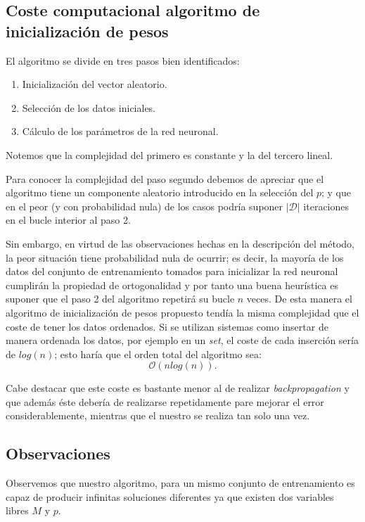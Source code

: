 \subsection{Coste computacional algoritmo de inicialización de pesos}

El algoritmo se divide en tres pasos bien identificados: 
\begin{enumerate}
    \item Inicialización del vector aleatorio.
    \item Selección de los datos iniciales.
    \item Cálculo de los parámetros de la red neuronal.
\end{enumerate}
Notemos que la complejidad del primero es constante y
la del tercero lineal. 

Para conocer la complejidad 
del paso segundo debemos de apreciar que el algoritmo 
tiene un componente aleatorio introducido en la selección del $p$; 
y que en el peor (y con probabilidad nula) de los casos podría suponer
$|\mathcal{D}|$ iteraciones en el bucle interior al paso 2.  

Sin embargo, en virtud de las observaciones hechas en la 
descripción del método, la peor situación tiene probabilidad nula de ocurrir;
es decir,
la mayoría de los datos del conjunto de entrenamiento tomados para inicializar la red neuronal cumplirán la propiedad de ortogonalidad y por tanto una buena 
heurística es suponer 
que  el paso 2 del algoritmo repetirá su bucle $n$ veces. 
De esta manera el algoritmo de inicialización de pesos propuesto tendía la misma complejidad que el coste 
de tener los datos ordenados. 
Si se utilizan sistemas como insertar de manera ordenada los datos, por ejemplo en un \textit{set}, 
el coste de cada inserción sería de $log(n)$; esto haría que el orden total del algoritmo sea: 
\begin{equation}
    \mathcal{O}(n log(n)).
\end{equation}

Cabe destacar que este coste es bastante menor al de realizar \textit{backpropagation} 
y que además éste debería de realizarse repetidamente pare mejorar el error considerablemente, 
 mientras que el nuestro se realiza tan solo una vez. 


\subsection{Observaciones }

Observemos que nuestro algoritmo, para un mismo conjunto de entrenamiento  es capaz de producir infinitas soluciones 
diferentes ya que 
existen dos variables libres $M$ y $p$. 

